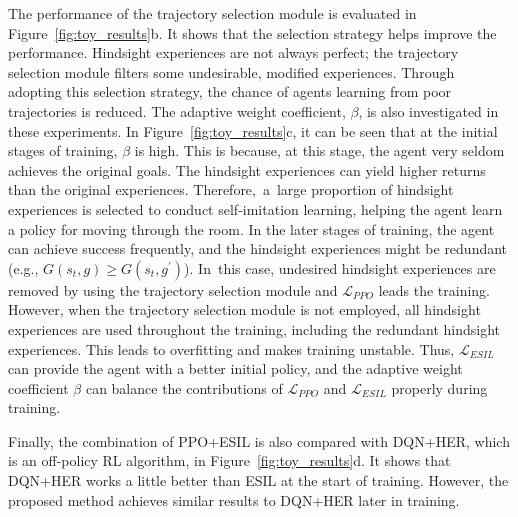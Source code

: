 The performance of the trajectory selection module is evaluated in Figure~\ref{fig:toy_results}b. It shows that the selection strategy helps improve the performance. Hindsight experiences are not always perfect; the trajectory selection module filters some undesirable, modified experiences. Through adopting this selection strategy, the chance of agents learning from poor trajectories is reduced. The adaptive weight coefficient, $\beta$, is also investigated in these experiments. {In Figure~\ref{fig:toy_results}c, it can be seen that at the initial stages of training, $\beta$ is high}. {This is because, at this stage, the agent very seldom achieves the original goals}. The hindsight experiences can yield higher returns than the original experiences. {Therefore,~a~large proportion of hindsight experiences is selected to conduct self-imitation learning, helping the agent learn a policy for moving through the room}. In the later stages of training, the agent can achieve success frequently, and the hindsight experiences might be redundant (e.g., $G(s_{t}, g)\geq G(s_{t}, g^{\prime})$). In~this case, undesired hindsight experiences are removed by using the trajectory selection module and $\mathcal{L}_{PPO}$ leads the training. However, when the trajectory selection module is not employed, all hindsight experiences are used throughout the training, including the redundant hindsight experiences. This leads to overfitting and makes training unstable. Thus, $\mathcal{L}_{ESIL}$ can provide the agent with a better initial policy, and the adaptive weight coefficient $\beta$ can balance the contributions of $\mathcal{L}_{PPO}$ and $\mathcal{L}_{ESIL}$ properly during training.

Finally, {the combination of PPO+ESIL is also compared with DQN+HER,} which is an off-policy RL algorithm, in Figure~\ref{fig:toy_results}d. It shows that DQN+HER works a little better than ESIL at the {start of training}. However, the proposed method achieves similar results to DQN+HER later in training.

